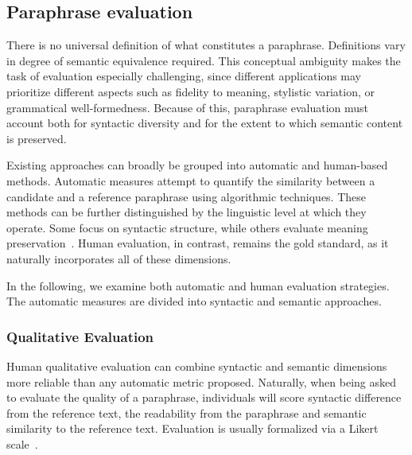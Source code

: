 
\subsection{Paraphrase evaluation}
\label{subsec:paraphrase_evaluation}

There is no universal definition of what constitutes a paraphrase. 
Definitions vary in degree of semantic equivalence required. 
This conceptual ambiguity makes the task of evaluation especially challenging, since different applications may prioritize different aspects such as fidelity to meaning, stylistic variation, or grammatical well-formedness.
Because of this, paraphrase evaluation must account both for syntactic diversity and for the extent to which semantic content is preserved. 

Existing approaches can broadly be grouped into automatic and human-based methods. 
Automatic measures attempt to quantify the similarity between a candidate and a reference paraphrase using algorithmic techniques. 
These methods can be further distinguished by the linguistic level at which they operate. 
Some focus on syntactic structure, while others evaluate meaning preservation~\citep{gohsen_captions_2023}. 
Human evaluation, in contrast, remains the gold standard, as it naturally incorporates all of these dimensions.



In the following, we examine both automatic and human evaluation strategies. 
The automatic measures are divided into syntactic and semantic approaches.




\subsubsection{Qualitative Evaluation}
\label{subsec:qualitative_evaluation}

Human qualitative evaluation can combine syntactic and semantic dimensions more reliable than any automatic metric proposed.
Naturally, when being asked to evaluate the quality of a paraphrase, individuals will score syntactic difference from the reference text, the readability from the paraphrase and semantic similarity to the reference text.
Evaluation is usually formalized via a Likert scale~\citep{gohsen_captions_2023}.
